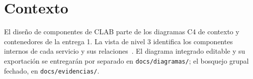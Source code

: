 \section*{Contexto}
El diseño de componentes de CLAB parte de los diagramas C4 de contexto y
contenedores de la entrega 1. La vista de nivel 3 identifica los componentes
internos de cada servicio y sus relaciones~\cite{brownC4Componentes}.
El diagrama integrado editable y su exportación se entregarán por separado
en \texttt{docs/diagramas/}; el bosquejo grupal fechado, en \texttt{docs/evidencias/}.
